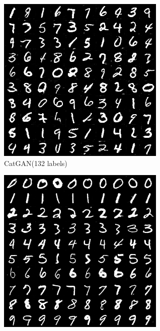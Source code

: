 \begin{figure}[htbp]
  \begin{subfigure}[b]{\trif\textwidth}
    \includegraphics[width=\textwidth]{Img/cg-132labels-new.png}
    \caption{CatGAN(132 labels)}
    \label{ffig:m-ss-cg}
  \end{subfigure}
  \begin{subfigure}[b]{\trif\textwidth}
    \includegraphics[width=\textwidth]{Img/icg-132labels-new.png}

\end{subfigure}
\end{figure}
